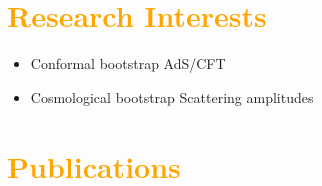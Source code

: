 \documentclass[letterpaper,11pt]{article}
\begin{document}
 \section{\textcolor{Orange}{Research Interests}}
\begin{itemize}[noitemsep,nolistsep] 
	\item[] Conformal bootstrap\hspace*{13.2em} AdS/CFT
	\item[] Cosmological bootstrap\hspace*{12em} Scattering amplitudes
\end{itemize}

 \section{\textcolor{Orange}{Publications}}
\end{document}
